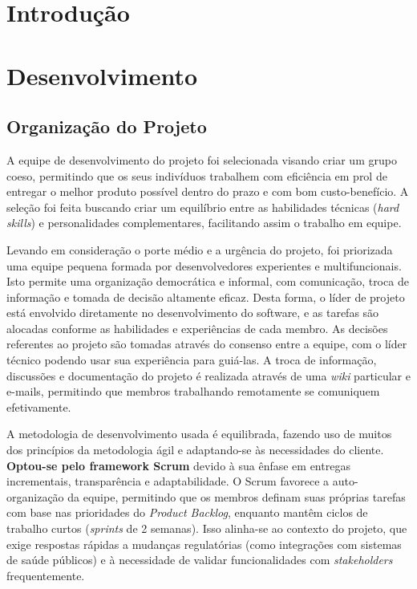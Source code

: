 \documentclass[a5paper, 12pt]{article}
\begin{document}

\newpage

\section{Introdução}
\newpage
\section{Desenvolvimento}
\subsection{Organização do Projeto}
A equipe de desenvolvimento do projeto foi selecionada visando criar um grupo coeso, permitindo que os seus indivíduos trabalhem com eficiência em prol de entregar o melhor produto possível dentro do prazo e com bom custo-benefício. A seleção foi feita buscando criar um equilíbrio entre as habilidades técnicas (\textit{hard skills}) e personalidades complementares, facilitando assim o trabalho em equipe.

Levando em consideração o porte médio e a urgência do projeto, foi priorizada uma equipe pequena formada por desenvolvedores experientes e multifuncionais. Isto permite uma organização democrática e informal, com comunicação, troca de informação e tomada de decisão altamente eficaz. Desta forma, o líder de projeto está envolvido diretamente no desenvolvimento do software, e as tarefas são alocadas conforme as habilidades e experiências de cada membro. As decisões referentes ao projeto são tomadas através do consenso entre a equipe, com o líder técnico podendo usar sua experiência para guiá-las. A troca de informação, discussões e documentação do projeto é realizada através de uma \textit{wiki} particular e e-mails, permitindo que membros trabalhando remotamente se comuniquem efetivamente.

A metodologia de desenvolvimento usada é equilibrada, fazendo uso de muitos dos princípios da metodologia ágil e adaptando-se às necessidades do cliente. \textbf{Optou-se pelo framework Scrum} devido à sua ênfase em entregas incrementais, transparência e adaptabilidade. O Scrum favorece a auto-organização da equipe, permitindo que os membros definam suas próprias tarefas com base nas prioridades do \textit{Product Backlog}, enquanto mantêm ciclos de trabalho curtos (\textit{sprints} de 2 semanas). Isso alinha-se ao contexto do projeto, que exige respostas rápidas a mudanças regulatórias (como integrações com sistemas de saúde públicos) e à necessidade de validar funcionalidades com \textit{stakeholders} frequentemente. 
\end{document}

